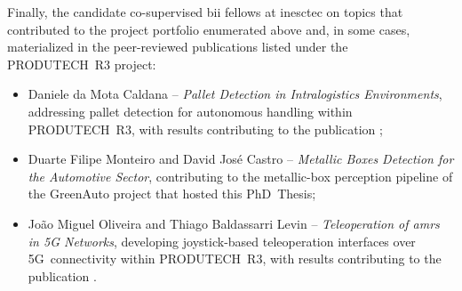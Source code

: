 Finally, the candidate co-supervised \gls{bii} fellows at \gls{inesctec}
on topics that contributed to the project portfolio enumerated above
and, in some cases, materialized in the peer-reviewed publications
listed under the PRODUTECH~R3 project:
\begin{itemize}
\item Daniele da Mota Caldana --
      \textit{Pallet Detection in Intralogistics Environments},
      addressing pallet detection for autonomous handling within
      PRODUTECH~R3, with results contributing to the publication
      \cite{caldana:robot:2024};
\item Duarte Filipe Monteiro and David José Castro --
      \textit{Metallic Boxes Detection for the Automotive Sector},
      contributing to the metallic-box perception pipeline of the
      GreenAuto project that hosted this PhD~Thesis;
\item João Miguel Oliveira and Thiago Baldassarri Levin --
      \textit{Teleoperation of \glspl{amr} in 5G Networks},
      developing joystick-based teleoperation interfaces over
      5G~connectivity within PRODUTECH~R3, with results contributing
      to the publication \cite{levin:robot:2024}.
\end{itemize}
